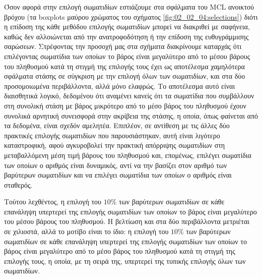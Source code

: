 Όσον αφορά στην επιλογή σωματιδίων εστιάζουμε στα σφάλματα του MCL ανοικτού
βρόχου (τα boxplots μαύρου χρώματος του σχήματος \ref{fig:02_02_04:selections})
διότι η επίδοση της κάθε μεθόδου επιλογής σωματιδίων μπορεί να διακριθεί με
σαφήνεια, καθώς δεν αλλοιώνεται από την ανατροφοδότηση ή την επίδοση της
ευθυγράμμισης σαρώσεων. Στρέφοντας την προσοχή μας στα σχήματα διακρίνουμε
καταρχάς ότι επιλέγοντας σωματίδια των οποίων το βάρος είναι μεγαλύτερο από το
μέσου βάρους του πληθυσμού κατά τη στιγμή της επιλογής τους έχει ως αποτέλεσμα
χαμηλότερα σφάλματα στάσης σε σύγκριση με την επιλογή όλων των σωματιδίων, και
στα δύο προσομοιωμένα περιβάλλοντα, αλλά μόνο ελαφρώς. Το αποτέλεσμα αυτό
είναι διαισθητικά λογικό, δεδομένου ότι αναμένει κανείς ότι τα σωματίδια που
συμβάλλουν στη συνολική στάση με βάρος μικρότερο από το μέσο βάρος του πληθυσμού
έχουν συνολικά αρνητική συνεισφορά στην ακρίβεια της στάσης, η οποία, όπως
φαίνεται από τα δεδομένα, είναι σχεδόν αμελητέα. Επιπλέον, σε αντίθεση με
τις άλλες δύο πρακτικές επιλογής σωματιδίων που παρουσιάστηκαν, αυτή είναι
λιγότερο καταστροφική, αφού αγκυροβολεί την πρακτική απόρριψης σωματιδίων στη
μεταβαλλόμενη μέση τιμή βάρους του πληθυσμού και, επομένως, επιλέγει σωματίδια
των οποίων ο αριθμός είναι δυναμικός, αντί να την βασίζει στον αριθμό των
βαρύτερων σωματιδίων και να επιλέγει σωματίδια των οποίων ο αριθμός είναι
σταθερός.

Τούτου λεχθέντος, η επιλογή του $10\%$ των βαρύτερων σωματιδίων σε κάθε
επανάληψη υπερτερεί της επιλογής σωματιδίων των οποίων το βάρος είναι
μεγαλύτερο του μέσου βάρους του πληθυσμού. Η βελτίωση και στα δύο
περιβάλλοντα μετριέται σε χιλιοστά, αλλά το μοτίβο είναι το ίδιο: η επιλογή
του $10\%$ των βαρύτερων σωματιδίων σε κάθε επανάληψη υπερτερεί της
επιλογής σωματιδίων των οποίων το βάρος είναι μεγαλύτερο από το μέσο βάρος του
πληθυσμού κατά τη στιγμή της επιλογής τους, η οποία, με τη σειρά της,
υπερτερεί της τυπικής επιλογής όλων των σωματιδίων.

